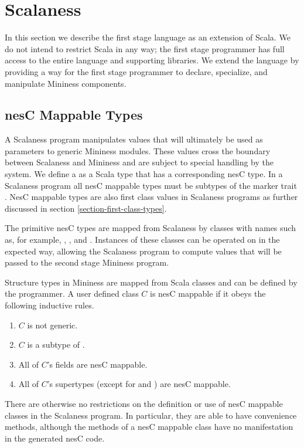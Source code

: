 
\section{Scalaness}
\label{section-scalaness}

In this section we describe the first stage language as an extension
of Scala. We do not intend to restrict Scala in any way; the first
stage programmer has full access to the entire language and supporting
libraries. We extend the language by providing a way for the first
stage programmer to declare, specialize, and manipulate Mininess
components.

\subsection{nesC Mappable Types}

A Scalaness program manipulates values that will ultimately be used as
parameters to generic Mininess modules. These values cross the
boundary between Scalaness and Mininess and are subject to special
handling by the system. We define a  as a
Scala type that has a corresponding nesC type. In a Scalaness program
all nesC mappable types must be subtypes of the marker trait
. NesC mappable types are also first class values in
Scalaness programs as further discussed in section
\autoref{section-first-class-types}.

The primitive nesC types are mapped from Scalaness by classes with
names such as, for example, , , and
. Instances of these classes can be operated on in the
expected way, allowing the Scalaness program to compute values that
will be passed to the second stage Mininess program.

Structure types in Mininess are mapped from Scala classes and can be
defined by the programmer. A user defined class $C$ is nesC mappable
if it obeys the following inductive rules.
\begin{enumerate}
\item $C$ is not generic.
\item $C$ is a subtype of .
\item All of $C$'s fields are nesC mappable.
\item All of $C$'s supertypes (except for  and
  ) are nesC mappable.
\end{enumerate}

There are otherwise no restrictions on the definition or use of nesC
mappable classes in the Scalaness program. In particular, they are
able to have convenience methods, although the methods of a nesC
mappable class have no manifestation in the generated nesC code.


